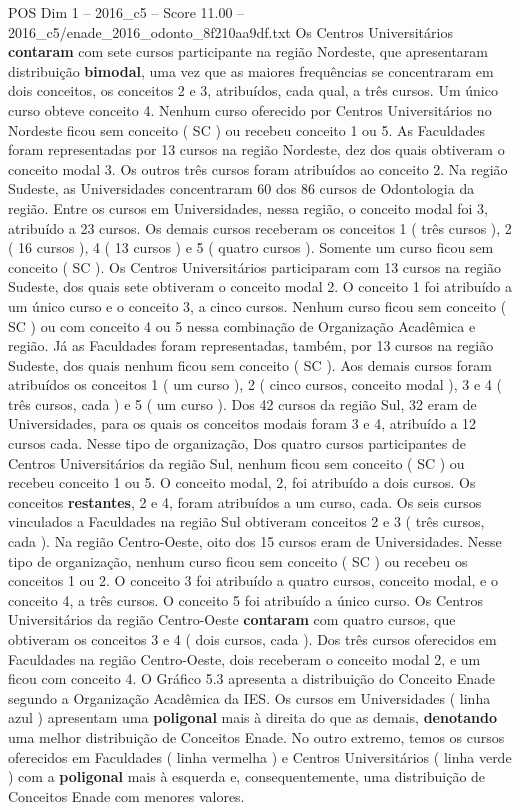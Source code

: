 \begin{textsample}{POS Dim 1 – 2016\_c5 – Score 11.00 – 2016\_c5/enade\_2016\_odonto\_8f210aa9df.txt}
Os Centros Universitários \textbf{contaram} com sete cursos participante na região Nordeste, que apresentaram distribuição \textbf{bimodal}, uma vez que as maiores frequências se concentraram em dois conceitos, os conceitos 2 e 3, atribuídos, cada qual, a três cursos.
Um único curso obteve conceito 4.
Nenhum curso oferecido por Centros Universitários no Nordeste ficou sem conceito ( SC ) ou recebeu conceito 1 ou 5.
As Faculdades foram representadas por 13 cursos na região Nordeste, dez dos quais obtiveram o conceito modal 3.
Os outros três cursos foram atribuídos ao conceito 2.
Na região Sudeste, as Universidades concentraram 60 dos 86 cursos de Odontologia da região.
Entre os cursos em Universidades, nessa região, o conceito modal foi 3, atribuído a 23 cursos.
Os demais cursos receberam os conceitos 1 ( três cursos ), 2 ( 16 cursos ), 4 ( 13 cursos ) e 5 ( quatro cursos ).
Somente um curso ficou sem conceito ( SC ).
Os Centros Universitários participaram com 13 cursos na região Sudeste, dos quais sete obtiveram o conceito modal 2.
O conceito 1 foi atribuído a um único curso e o conceito 3, a cinco cursos.
Nenhum curso ficou sem conceito ( SC ) ou com conceito 4 ou 5 nessa combinação de Organização Acadêmica e região.
Já as Faculdades foram representadas, também, por 13 cursos na região Sudeste, dos quais nenhum ficou sem conceito ( SC ).
Aos demais cursos foram atribuídos os conceitos 1 ( um curso ), 2 ( cinco cursos, conceito modal ), 3 e 4 ( três cursos, cada ) e 5 ( um curso ).
Dos 42 cursos da região Sul, 32 eram de Universidades, para os quais os conceitos modais foram 3 e 4, atribuído a 12 cursos cada.
Nesse tipo de organização, Dos quatro cursos participantes de Centros Universitários da região Sul, nenhum ficou sem conceito ( SC ) ou recebeu conceito 1 ou 5.
O conceito modal, 2, foi atribuído a dois cursos.
Os conceitos \textbf{restantes}, 2 e 4, foram atribuídos a um curso, cada.
Os seis cursos vinculados a Faculdades na região Sul obtiveram conceitos 2 e 3 ( três cursos, cada ).
Na região Centro-Oeste, oito dos 15 cursos eram de Universidades.
Nesse tipo de organização, nenhum curso ficou sem conceito ( SC ) ou recebeu os conceitos 1 ou 2.
O conceito 3 foi atribuído a quatro cursos, conceito modal, e o conceito 4, a três cursos.
O conceito 5 foi atribuído a único curso.
Os Centros Universitários da região Centro-Oeste \textbf{contaram} com quatro cursos, que obtiveram os conceitos 3 e 4 ( dois cursos, cada ).
Dos três cursos oferecidos em Faculdades na região Centro-Oeste, dois receberam o conceito modal 2, e um ficou com conceito 4.
O Gráfico 5.3 apresenta a distribuição do Conceito Enade segundo a Organização Acadêmica da IES.
Os cursos em Universidades ( linha azul ) apresentam uma \textbf{poligonal} mais à direita do que as demais, \textbf{denotando} uma melhor distribuição de Conceitos Enade.
No outro extremo, temos os cursos oferecidos em Faculdades ( linha vermelha ) e Centros Universitários ( linha verde ) com a \textbf{poligonal} mais à esquerda e, consequentemente, uma distribuição de Conceitos Enade com menores valores.

\end{textsample}
